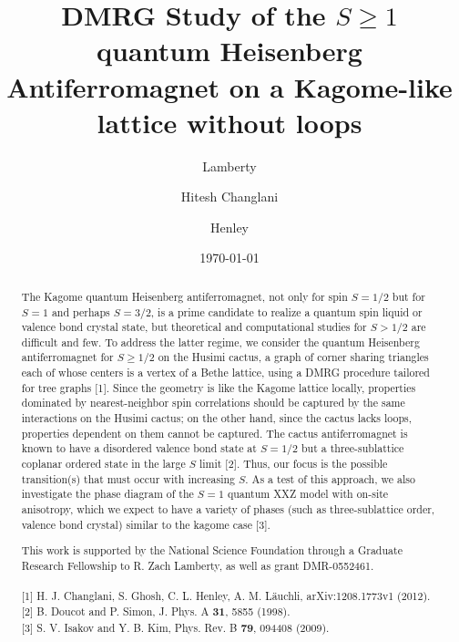 \documentclass[aps]{revtex4-1}
\begin{document}
\title{DMRG Study of the $S\ge 1$ quantum Heisenberg Antiferromagnet on a Kagome-like lattice without loops}
\date{\today}

\author{ Lamberty}
\author{Hitesh Changlani}
\author{ Henley}

\begin{abstract}
The Kagome quantum Heisenberg antiferromagnet, not only for spin $S=1/2$ 
but for $S=1$ and perhaps $S=3/2$,  is a prime candidate to realize a 
quantum spin liquid or valence bond crystal state, but 
theoretical and computational studies for $S>1/2$ are difficult and few.
To address the latter regime, we consider the quantum Heisenberg 
antiferromagnet for $S\ge1/2$ on the Husimi cactus, a graph of corner sharing 
triangles each of whose centers is a vertex of a Bethe lattice, 
using a DMRG procedure tailored for tree graphs $[$1$]$.
Since the geometry is like the Kagome lattice locally, 
properties dominated by nearest-neighbor spin correlations 
should be captured by the same interactions on the Husimi cactus; 
on the other hand, since the cactus lacks loops, 
properties dependent on them cannot be captured.  
The cactus antiferromagnet is known to have a disordered valence bond state
at $S=1/2$ but a three-sublattice coplanar ordered state in the large 
$S$ limit $[$2$]$. 
Thus, our focus is the possible transition(s) that must occur with increasing 
$S$.  As a test of this approach, we also investigate the phase diagram 
of the $S=1$ quantum XXZ model with on-site anisotropy, which we expect to
have a variety of phases (such as three-sublattice order, valence bond crystal)
similar to the kagome case $[$3$]$.

This work is supported by the National Science Foundation through a Graduate Research Fellowship to R. Zach Lamberty, as well as grant DMR-0552461.\\
\\
\noindent
$[$1$]$ H. J. Changlani, S. Ghosh, C. L. Henley, A. M. L\"{a}uchli, arXiv:1208.1773v1 (2012).\\
$[$2$]$ B. Doucot and P. Simon, J. Phys. A \textbf{31}, 5855 (1998).\\
$[$3$]$ S. V. Isakov and Y. B. Kim, Phys. Rev. B \textbf{79}, 094408 (2009).\\

\end{abstract}
\maketitle
\end{document}

